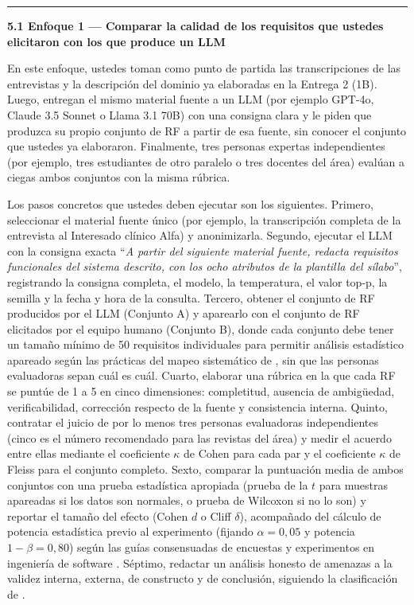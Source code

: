 \documentclass[11pt,a4paper]{article}
\newcommand{\submark}[1]{\par\vspace{4pt}\noindent
    {\color{uteqgreen}\rule[-1pt]{3.5pt}{12pt}}\hspace{6pt}\textbf{\color{uteqgreen}#1}\par\vspace{2pt}}
\begin{document}
\submark{5.1 Enfoque 1 --- Comparar la calidad de los requisitos que ustedes elicitaron con los que produce un LLM}
En este enfoque, ustedes toman como punto de partida las transcripciones de las entrevistas y la descripción del dominio ya elaboradas en la Entrega 2 (1B).
Luego, entregan el mismo material fuente a un LLM (por ejemplo GPT-4o, Claude 3.5 Sonnet o Llama 3.1 70B) con una consigna clara y le piden que produzca su propio conjunto de RF a partir de esa fuente, sin conocer el conjunto que ustedes ya elaboraron.
Finalmente, tres personas expertas independientes (por ejemplo, tres estudiantes de otro paralelo o tres docentes del área) evalúan a ciegas ambos conjuntos con la misma rúbrica.

Los pasos concretos que ustedes deben ejecutar son los siguientes.
Primero, seleccionar el material fuente único (por ejemplo, la transcripción completa de la entrevista al Interesado clínico Alfa) y anonimizarla.
Segundo, ejecutar el LLM con la consigna exacta ``\emph{A partir del siguiente material fuente, redacta requisitos funcionales del sistema descrito, con los ocho atributos de la plantilla del sílabo}'', registrando la consigna completa, el modelo, la temperatura, el valor top-p, la semilla y la fecha y hora de la consulta.
Tercero, obtener el conjunto de RF producidos por el LLM (Conjunto A) y aparearlo con el conjunto de RF elicitados por el equipo humano (Conjunto B), donde cada conjunto debe tener un tamaño mínimo de 50 requisitos individuales para permitir análisis estadístico apareado según las prácticas del mapeo sistemático de \cite{montgomery2022requirements}, sin que las personas evaluadoras sepan cuál es cuál.
Cuarto, elaborar una rúbrica en la que cada RF se puntúe de 1 a 5 en cinco dimensiones: completitud, ausencia de ambigüedad, verificabilidad, corrección respecto de la fuente y consistencia interna.
Quinto, contratar el juicio de por lo menos tres personas evaluadoras independientes (cinco es el número recomendado para las revistas del área) y medir el acuerdo entre ellas mediante el coeficiente $\kappa$ de Cohen \cite{cohen1960kappa} para cada par y el coeficiente $\kappa$ de Fleiss \cite{fleiss1971kappa} para el conjunto completo.
Sexto, comparar la puntuación media de ambos conjuntos con una prueba estadística apropiada (prueba de la $t$ para muestras apareadas si los datos son normales, o prueba de Wilcoxon si no lo son) y reportar el tamaño del efecto (Cohen $d$ o Cliff $\delta$), acompañado del cálculo de potencia estadística previo al experimento (fijando $\alpha = 0{,}05$ y potencia $1-\beta = 0{,}80$) según las guías consensuadas de encuestas y experimentos en ingeniería de software \cite{molleri2020checklist}.
Séptimo, redactar un análisis honesto de amenazas a la validez interna, externa, de constructo y de conclusión, siguiendo la clasificación de \cite{wohlin2012experimentation}.
\end{document}
